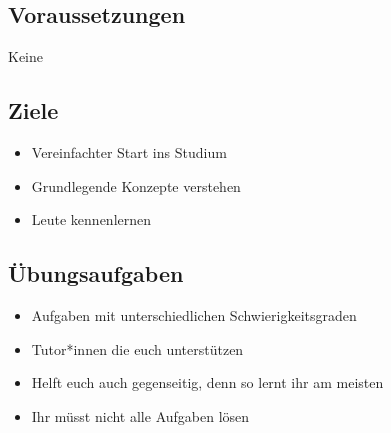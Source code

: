 
\subsection{Voraussetzungen}
\begin{frame}
    \slidehead
    \centering
    \vspace{1.5cm}
    \Huge Keine
\end{frame}

\subsection{Ziele}
\begin{frame}
    \slidehead
    \begin{itemize}
        \item Vereinfachter Start ins Studium
        \item Grundlegende Konzepte verstehen
        \item Leute kennenlernen

    \end{itemize}
\end{frame}

\subsection{Übungsaufgaben}
\begin{frame}
    \slidehead
    \begin{itemize}
        \item Aufgaben mit unterschiedlichen Schwierigkeitsgraden
        \item Tutor*innen
            die euch unterstützen
        \item Helft euch auch gegenseitig, denn so lernt ihr am meisten
        \item Ihr müsst nicht alle Aufgaben lösen
    \end{itemize}
\end{frame}


